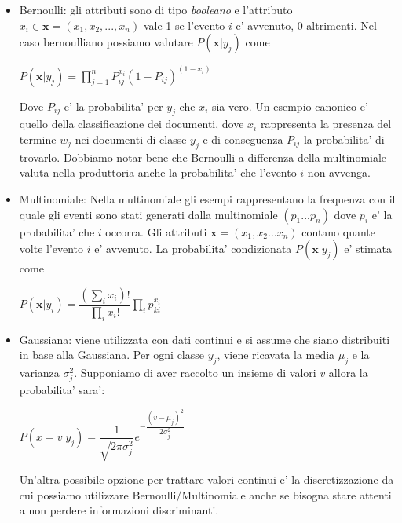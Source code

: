 \begin{itemize}
	\item Bernoulli: gli attributi sono di tipo \textit{booleano} e l'attributo $x_i \in \textbf{x}=(x_1,x_2,...,x_n)$ vale 1 se l'evento $i$ e' avvenuto, 0 altrimenti. Nel caso bernoulliano possiamo valutare $P(\textbf{x}|y_j)$ come
	\begin{center}
	 $P(\textbf{x}|y_j) = \prod_{j=1}^{n} P_{ij}^{x_i} (1-P_{ij})^{(1-x_i)}$
	\end{center}
	Dove $P_{ij}$ e' la probabilita' per $y_j$ che $x_i$ sia vero. Un esempio canonico e' quello della classificazione dei documenti, dove $x_i$ rappresenta la presenza del termine $w_j$ nei documenti di classe $y_j$ e di conseguenza $P_{ij}$ la probabilita' di trovarlo. Dobbiamo notar bene che Bernoulli a differenza della multinomiale valuta nella produttoria anche la probabilita' che l'evento $i$ non avvenga.
	

	\item Multinomiale: Nella multinomiale gli esempi rappresentano la frequenza con il quale gli eventi sono stati generati dalla multinomiale $(p_1...p_n)$ dove $p_i$ e' la probabilita' che $i$ occorra. Gli attributi $\textbf{x}=(x_1,x_2...x_n)$ contano quante volte l'evento $i$ e' avvenuto. La probabilita' condizionata  $P(\textbf{x}|y_j)$ e' stimata come
	\begin{center}
		$P(\textbf{x}|y_i) = \dfrac{(\sum_{i}x_i)!}{\prod_{i}x_i!}\prod_i p_{ki}^{x_i}$
	\end{center}
	\item Gaussiana: viene utilizzata con dati continui e si assume che siano distribuiti in base alla Gaussiana. Per ogni classe $y_j$, viene ricavata la media $\mu_j$ e la varianza $\sigma_{j}^{2}$. Supponiamo di aver raccolto un insieme di valori $v$ allora la probabilita' sara':
	\begin{center}
		$P(x =v | y_j) = \dfrac{1}{\sqrt{2 \pi \sigma_{j}^2}} e^{-\dfrac{(v - \mu_j)^2}{2 \sigma_{j}^2}}$
	\end{center}
	Un'altra possibile opzione per trattare valori continui e' la discretizzazione da cui possiamo utilizzare Bernoulli/Multinomiale anche se bisogna stare attenti a non perdere informazioni discriminanti.
\end{itemize}

